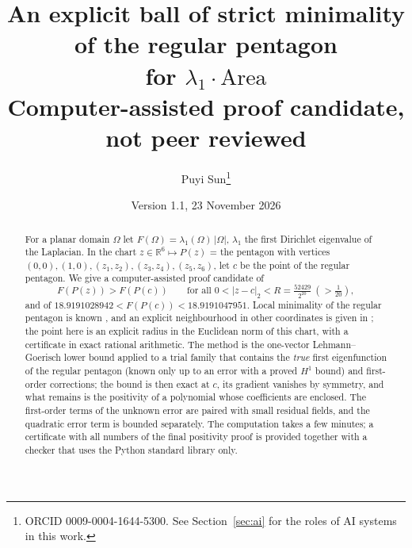 \documentclass[11pt]{article}
\title{An explicit ball of strict minimality of the regular pentagon\\ for $\lambda_1\cdot\mathrm{Area}$\\[4pt]
\large Computer-assisted proof candidate, not peer reviewed}
\author{Puyi Sun\thanks{ORCID 0009-0004-1644-5300. See Section~\ref{sec:ai} for the roles of AI systems in this work.}}
\date{Version 1.1, 23 November 2026}
\theoremstyle{remark}
\newcommand{\R}{\mathbb{R}}
\begin{document}
\maketitle

\begin{abstract}
For a planar domain $\Omega$ let $F(\Omega)=\lambda_1(\Omega)\,|\Omega|$, $\lambda_1$ the first Dirichlet eigenvalue of
the Laplacian. In the chart $z\in\R^6\mapsto P(z)$ = the pentagon with vertices $(0,0),(1,0),(z_1,z_2),(z_3,z_4),
(z_5,z_6)$, let $c$ be the point of the regular pentagon. We give a computer-assisted proof candidate of
\[
F(P(z))>F(P(c))\qquad\text{for all } 0<|z-c|_2<R=\tfrac{52429}{2^{20}}\ (>\tfrac1{20}),
\]
and of $18.9191028942<F(P(c))<18.9191047951$. Local minimality of the regular pentagon is known
\cite{bb-jep,bb-val}, and an explicit neighbourhood in other coordinates is given in \cite{liu}; the point here is an
explicit radius in the Euclidean norm of this chart, with a certificate in exact rational arithmetic. The method is the one-vector Lehmann--Goerisch lower bound applied to a trial family that
contains the \emph{true} first eigenfunction of the regular pentagon (known only up to an error with a proved $H^1$
bound) and first-order corrections; the bound is then exact at $c$, its gradient vanishes by symmetry, and what
remains is the positivity of a polynomial whose coefficients are enclosed. The first-order terms of the unknown error
are paired with small residual fields, and the quadratic error term is bounded separately. The computation takes a few minutes; a certificate with all numbers of the final
positivity proof is provided together with a checker that uses the Python standard library only.
\end{abstract}
\end{document}
